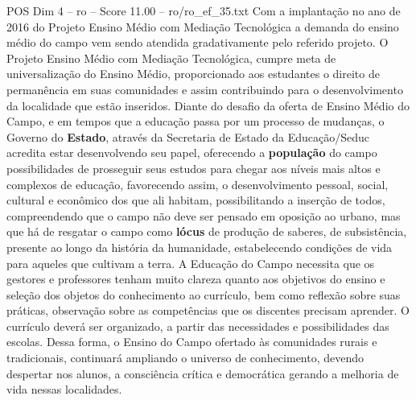 \begin{textsample}{POS Dim 4 – ro – Score 11.00 – ro/ro\_ef\_35.txt}
Com a implantação no ano de 2016 do Projeto Ensino Médio com Mediação Tecnológica a demanda do ensino médio do campo vem sendo atendida gradativamente pelo referido projeto.
O Projeto Ensino Médio com Mediação Tecnológica, cumpre meta de universalização do Ensino Médio, proporcionado aos estudantes o direito de permanência em suas comunidades e assim contribuindo para o desenvolvimento da localidade que estão inseridos.
Diante do desafio da oferta de Ensino Médio do Campo, e em tempos que a educação passa por um processo de mudanças, o Governo do \textbf{Estado}, através da Secretaria de Estado da Educação/Seduc acredita estar desenvolvendo seu papel, oferecendo a \textbf{população} do campo possibilidades de prosseguir seus estudos para chegar aos níveis mais altos e complexos de educação, favorecendo assim, o desenvolvimento pessoal, social, cultural e econômico dos que ali habitam, possibilitando a inserção de todos, compreendendo que o campo não deve ser pensado em oposição ao urbano, mas que há de resgatar o campo como \textbf{lócus} de produção de saberes, de subsistência, presente ao longo da história da humanidade, estabelecendo condições de vida para aqueles que cultivam a terra.
A Educação do Campo necessita que os gestores e professores tenham muito clareza quanto aos objetivos do ensino e seleção dos objetos do conhecimento ao currículo, bem como reflexão sobre suas práticas, observação sobre as competências que os discentes precisam aprender.
O currículo deverá ser organizado, a partir das necessidades e possibilidades das escolas.
Dessa forma, o Ensino do Campo ofertado às comunidades rurais e tradicionais, continuará ampliando o universo de conhecimento, devendo despertar nos alunos, a consciência crítica e democrática gerando a melhoria de vida nessas localidades.

\end{textsample}
